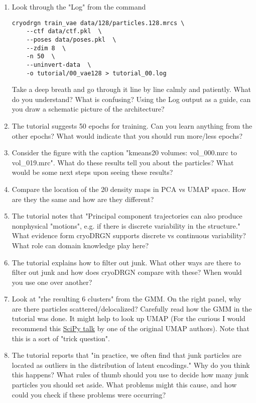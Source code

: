 \documentclass[11pt, oneside]{article}   	%
\begin{document}
\begin{enumerate}
	\item Look through the "Log" from the command
	\begin{lstlisting}
cryodrgn train_vae data/128/particles.128.mrcs \
	--ctf data/ctf.pkl  \
	--poses data/poses.pkl  \
	--zdim 8  \
	-n 50  \
	--uninvert-data  \
	-o tutorial/00_vae128 > tutorial_00.log							
	\end{lstlisting}		
	Take a deep breath and go through it line by line calmly and patiently. What do you understand? What is confusing?	Using the Log output as a guide, can you draw a schematic picture of the architecture?
	\item The tutorial suggests 50 epochs for training. Can you learn anything from the other epochs? What would indicate that you should run more/less epochs?
	\item Consider the figure with the caption "kmeans20 volumes: vol\_000.mrc to vol\_019.mrc". What do these results tell you about the particles? What would be some next steps upon seeing these results?	
	\item Compare the location of the 20 density maps in PCA vs UMAP space. How are they the same and how are they different?
	\item The tutorial notes that "Principal component trajectories can also produce nonphysical "motions", e.g. if there is discrete variability in the structure." What evidence form cryoDRGN supports discrete vs continuous variability?	 What role can domain knowledge play here?
	\item The tutorial explains how to filter out junk. What other ways are there to filter out junk and how does cryoDRGN compare with these? When would you use one over another?
	\item Look at "rhe resulting 6 clusters" from the GMM. On the right panel, why are there particles scattered/delocalized? Carefully read how the GMM in the tutorial was done. It might help to look up UMAP (For the curious I would recommend this \href{https://youtu.be/nq6iPZVUxZU}{SciPy talk} by one of the original UMAP authors). Note that this is a sort of "trick question".	
	\item The tutorial reports that "in practice, we often find that junk particles are located as outliers in the distribution of latent encodings." Why do you think this happens? What rules of thumb should you use to decide how many junk particles you should set aside. What problems might this cause, and how could you check if these problems were occurring? 

\end{enumerate}
\end{document}
